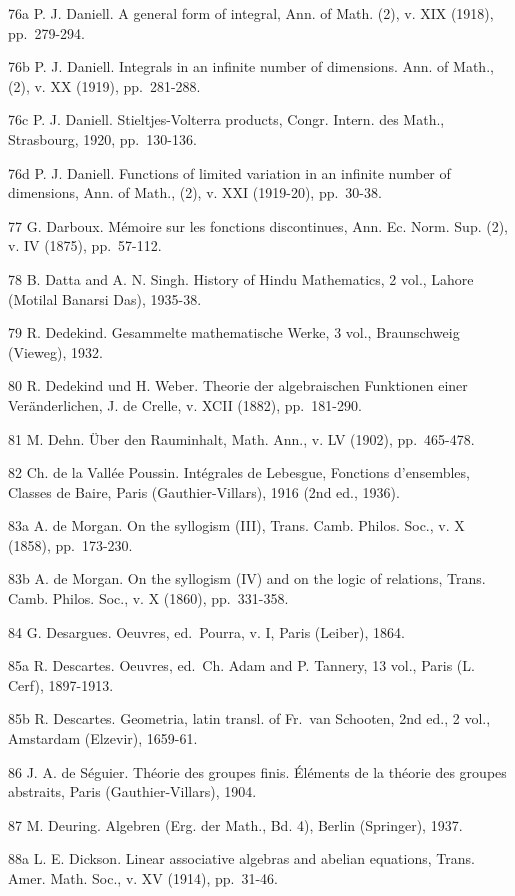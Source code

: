76a P. J. Daniell. A general form of integral, Ann. of Math. (2), v. XIX (1918), pp.~279-294.

76b P. J. Daniell. Integrals in an infinite number of dimensions. Ann. of Math., (2), v. XX (1919), pp.~281-288.

76c P. J. Daniell. Stieltjes-Volterra products, Congr. Intern. des Math., Strasbourg, 1920, pp.~130-136.

76d P. J. Daniell. Functions of limited variation in an infinite number of dimensions, Ann. of Math., (2), v. XXI (1919-20), pp.~30-38.

77 G. Darboux. Mémoire sur les fonctions discontinues, Ann. Ec. Norm. Sup. (2), v. IV (1875), pp.~57-112.

78 B. Datta and A. N. Singh. History of Hindu Mathematics, 2 vol., Lahore (Motilal Banarsi Das), 1935-38.

79 R. Dedekind. Gesammelte mathematische Werke, 3 vol., Braunschweig (Vieweg), 1932.

80 R. Dedekind und H. Weber. Theorie der algebraischen Funktionen einer Veränderlichen, J. de Crelle, v. XCII (1882), pp.~181-290.

81 M. Dehn. Über den Rauminhalt, Math. Ann., v. LV (1902), pp.~465-478.

82 Ch. de la Vallée Poussin. Intégrales de Lebesgue, Fonctions d'ensembles, Classes de Baire, Paris (Gauthier-Villars), 1916 (2nd ed., 1936).

83a A. de Morgan. On the syllogism (III), Trans. Camb. Philos. Soc., v. X (1858), pp.~173-230.

83b A. de Morgan. On the syllogism (IV) and on the logic of relations, Trans. Camb. Philos. Soc., v. X (1860), pp.~331-358.

84 G. Desargues. Oeuvres, ed.~Pourra, v. I, Paris (Leiber), 1864.

85a R. Descartes. Oeuvres, ed.~Ch. Adam and P. Tannery, 13 vol., Paris (L. Cerf), 1897-1913.

85b R. Descartes. Geometria, latin transl. of Fr.~van Schooten, 2nd ed., 2 vol., Amstardam (Elzevir), 1659-61.

86 J. A. de Séguier. Théorie des groupes finis. Éléments de la théorie des groupes abstraits, Paris (Gauthier-Villars), 1904.

87 M. Deuring. Algebren (Erg. der Math., Bd. 4), Berlin (Springer), 1937.

88a L. E. Dickson. Linear associative algebras and abelian equations, Trans. Amer. Math. Soc., v. XV (1914), pp.~31-46.

